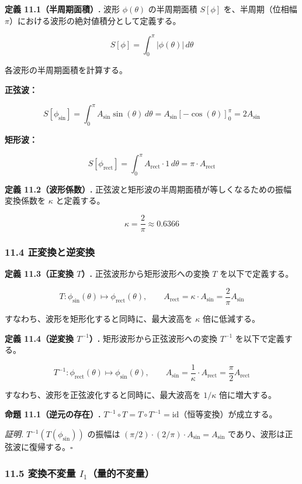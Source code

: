 \documentclass[a4paper,11pt]{ltjsarticle}
\begin{document}
\textbf{定義 11.1（半周期面積）.} 波形 \(\phi(\theta)\) の半周期面積
\(S[\phi]\) を、半周期（位相幅
\(\pi\)）における波形の絶対値積分として定義する。

\[S[\phi] = \int_0^{\pi} |\phi(\theta)|\, d\theta \tag{W3}\]

各波形の半周期面積を計算する。

\textbf{正弦波：}

\[S[\phi_{\sin}] = \int_0^{\pi} A_{\sin} \sin(\theta)\, d\theta = A_{\sin} \left[-\cos(\theta)\right]_0^{\pi} = 2A_{\sin} \tag{W4}\]

\textbf{矩形波：}

\[S[\phi_{\text{rect}}] = \int_0^{\pi} A_{\text{rect}} \cdot 1\, d\theta = \pi \cdot A_{\text{rect}} \tag{W5}\]

\textbf{定義 11.2（波形係数）.}
正弦波と矩形波の半周期面積が等しくなるための振幅変換係数を \(\kappa\)
と定義する。

\[\kappa = \frac{2}{\pi} \approx 0.6366 \tag{W6}\]

\subsubsection{11.4
正変換と逆変換}\label{ux6b63ux5909ux63dbux3068ux9006ux5909ux63db}

\textbf{定義 11.3（正変換 \(T\)）.} 正弦波形から矩形波形への変換 \(T\)
を以下で定義する。

\[T: \phi_{\sin}(\theta) \mapsto \phi_{\text{rect}}(\theta), \qquad A_{\text{rect}} = \kappa \cdot A_{\sin} = \frac{2}{\pi} A_{\sin} \tag{W7}\]

すなわち、波形を矩形化すると同時に、最大波高を \(\kappa\) 倍に低減する。

\textbf{定義 11.4（逆変換 \(T^{-1}\)）.} 矩形波形から正弦波形への変換
\(T^{-1}\) を以下で定義する。

\[T^{-1}: \phi_{\text{rect}}(\theta) \mapsto \phi_{\sin}(\theta), \qquad A_{\sin} = \frac{1}{\kappa} \cdot A_{\text{rect}} = \frac{\pi}{2} A_{\text{rect}} \tag{W8}\]

すなわち、波形を正弦波化すると同時に、最大波高を \(1/\kappa\)
倍に増大する。

\textbf{命題 11.1（逆元の存在）.}
\(T^{-1} \circ T = T \circ T^{-1} = \mathrm{id}\)（恒等変換）が成立する。

\emph{証明.} \(T^{-1}(T(\phi_{\sin}))\) の振幅は
\((\pi/2) \cdot (2/\pi) \cdot A_{\sin} = A_{\sin}\)
であり、波形は正弦波に復帰する。\(\square\)

\subsubsection{\texorpdfstring{11.5 変換不変量
\(I_1\)（量的不変量）}{11.5 変換不変量 I\_1（量的不変量）}}\label{ux5909ux63dbux4e0dux5909ux91cf-i_1ux91cfux7684ux4e0dux5909ux91cf}
\end{document}
